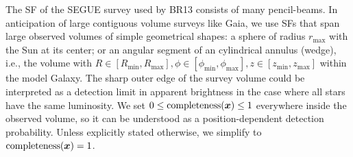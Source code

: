 The SF of the SEGUE survey \citep{2012ApJ...753..148B} used by BR13 consists of many pencil-beams. In anticipation of large contiguous volume surveys like Gaia, we use SFs that span large observed volumes of simple geometrical shapes: a sphere of radius $r_\text{max}$ with the Sun at its center; or an angular segment of an cylindrical annulus (wedge), i.e., the volume with $R \in [R_\text{min},R_\text{max}],\phi \in [\phi_\text{min},\phi_\text{max}],z \in [z_\text{min},z_\text{max}]$ within the model Galaxy. The sharp outer edge of the survey volume could be interpreted as a detection limit in apparent brightness in the case where all stars have the same luminosity. We set $0 \leq \text{completeness}(\boldsymbol{x}) \leq 1$ everywhere inside the observed volume, so it can be understood as a position-dependent detection probability. Unless explicitly stated otherwise, we simplify to $\text{completeness}(\boldsymbol{x}) = 1$.

